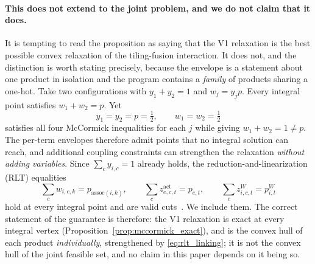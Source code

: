 \paragraph{This does not extend to the joint problem, and we do not claim that it does.}
It is tempting to read the proposition as saying that the V1 relaxation is the
best possible convex relaxation of the tiling-fusion interaction. It does not,
and the distinction is worth stating precisely, because the envelope is a
statement about one product in isolation and the program contains a
\emph{family} of products sharing a one-hot. Take two configurations with
$y_1+y_2=1$ and $w_j=y_j p$. Every integral point satisfies $w_1+w_2=p$. Yet
%
\begin{equation}
\label{eq:rlt_counterexample}
y_1=y_2=p=\tfrac12,\qquad w_1=w_2=\tfrac12
\end{equation}
%
satisfies all four McCormick inequalities for each $j$ while giving
$w_1+w_2=1\neq p$. The per-term envelopes therefore admit points that no
integral solution can reach, and additional coupling constraints can strengthen
the relaxation \emph{without adding variables}. Since $\sum_c y_{i,c}=1$ already
holds, the reduction-and-linearization (RLT) equalities
%
\begin{equation}
\label{eq:rlt_linking}
\sum_c w_{i,c,k} = p_{\mathrm{assoc}(i,k)},\qquad
\sum_c z^{\mathrm{act}}_{e,c,t} = p_{e,t},\qquad
\sum_c z^{W}_{i,c,t} = p^{W}_{i,t}
\end{equation}
%
hold at every integral point and are valid cuts~\citep{sherali1990hierarchy}. We
include them. The correct statement of the guarantee is therefore: the V1
relaxation is exact at every integral vertex (Proposition~\ref{prop:mccormick_exact}),
and is the convex hull of each product \emph{individually}, strengthened by
\cref{eq:rlt_linking}; it is not the convex hull of the joint feasible set, and
no claim in this paper depends on it being so.

